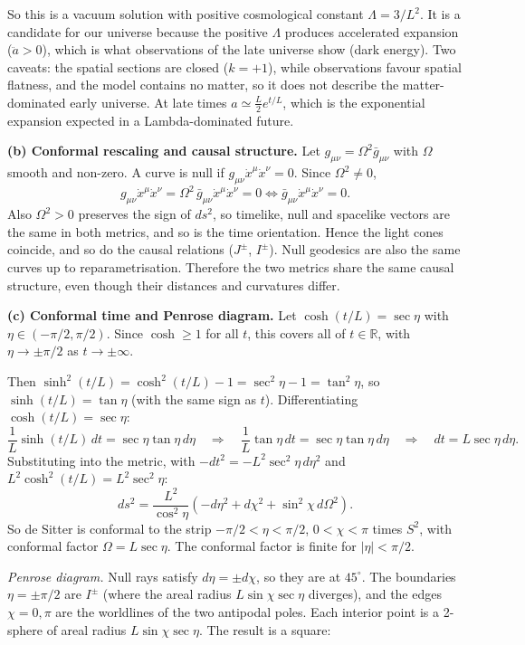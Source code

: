 \documentclass[12pt]{article}
\begin{document}
So this is a vacuum solution with positive cosmological constant $\Lambda=3/L^2$. It is a candidate for our universe because the positive $\Lambda$ produces accelerated expansion ($\ddot a>0$), which is what observations of the late universe show (dark energy). Two caveats: the spatial sections are closed ($k=+1$), while observations favour spatial flatness, and the model contains no matter, so it does not describe the matter-dominated early universe. At late times $a\simeq\frac{L}{2}e^{t/L}$, which is the exponential expansion expected in a Lambda-dominated future.

\textbf{(b) Conformal rescaling and causal structure.} Let $g_{\mu\nu}=\Omega^2\bar g_{\mu\nu}$ with $\Omega$ smooth and non-zero. A curve is null if $g_{\mu\nu}\dot x^\mu\dot x^\nu=0$. Since $\Omega^2\neq0$,
\[
g_{\mu\nu}\dot x^\mu\dot x^\nu=\Omega^2\,\bar g_{\mu\nu}\dot x^\mu\dot x^\nu=0\iff \bar g_{\mu\nu}\dot x^\mu\dot x^\nu=0 .
\]
Also $\Omega^2>0$ preserves the sign of $ds^2$, so timelike, null and spacelike vectors are the same in both metrics, and so is the time orientation. Hence the light cones coincide, and so do the causal relations ($J^\pm$, $I^\pm$). Null geodesics are also the same curves up to reparametrisation. Therefore the two metrics share the same causal structure, even though their distances and curvatures differ.

\textbf{(c) Conformal time and Penrose diagram.} Let $\cosh(t/L)=\sec\eta$ with $\eta\in(-\pi/2,\pi/2)$. Since $\cosh\ge1$ for all $t$, this covers all of $t\in\mathbb{R}$, with $\eta\to\pm\pi/2$ as $t\to\pm\infty$.

Then $\sinh^2(t/L)=\cosh^2(t/L)-1=\sec^2\eta-1=\tan^2\eta$, so $\sinh(t/L)=\tan\eta$ (with the same sign as $t$). Differentiating $\cosh(t/L)=\sec\eta$:
\[
\frac{1}{L}\sinh(t/L)\,dt=\sec\eta\tan\eta\,d\eta \quad\Rightarrow\quad \frac{1}{L}\tan\eta\,dt=\sec\eta\tan\eta\,d\eta\quad\Rightarrow\quad dt=L\sec\eta\,d\eta .
\]
Substituting into the metric, with $-dt^2=-L^2\sec^2\eta\,d\eta^2$ and $L^2\cosh^2(t/L)=L^2\sec^2\eta$:
\[
ds^2=\frac{L^2}{\cos^2\eta}\left(-d\eta^2+d\chi^2+\sin^2\chi\,d\Omega^2\right).
\]
So de Sitter is conformal to the strip $-\pi/2<\eta<\pi/2$, $0<\chi<\pi$ times $S^2$, with conformal factor $\Omega=L\sec\eta$. The conformal factor is finite for $|\eta|<\pi/2$.

\emph{Penrose diagram.} Null rays satisfy $d\eta=\pm d\chi$, so they are at $45^\circ$. The boundaries $\eta=\pm\pi/2$ are $I^\pm$ (where the areal radius $L\sin\chi\sec\eta$ diverges), and the edges $\chi=0,\pi$ are the worldlines of the two antipodal poles. Each interior point is a 2-sphere of areal radius $L\sin\chi\sec\eta$. The result is a square:
\end{document}
